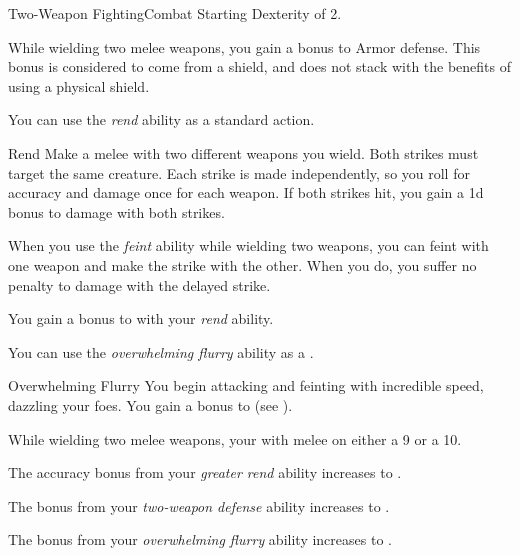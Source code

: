     \begin{feat}{Two-Weapon Fighting}{Combat}
        \featpre Starting Dexterity of 2.

         While wielding two melee weapons, you gain a  bonus to Armor defense.
        This bonus is considered to come from a shield, and does not stack with the benefits of using a physical shield.

         You can use the \textit{rend} ability as a standard action.
        \begin{apability}{Rend}
            Make a melee  with two different weapons you wield.
            Both strikes must target the same creature.
            Each strike is made independently, so you roll for accuracy and damage once for each weapon.
            If both strikes hit, you gain a \plus1d bonus to damage with both strikes.
        \end{apability}

         When you use the \textit{feint} ability while wielding two weapons, you can feint with one weapon and make the strike with the other.
        When you do, you suffer no penalty to damage with the delayed strike.

         You gain a  bonus to  with your \textit{rend} ability.

         You can use the \textit{overwhelming flurry} ability as a .
        \begin{attuneability}{Overwhelming Flurry}
            You begin attacking and feinting with incredible speed, dazzling your foes.
            You gain a  bonus to  (see ).
        \end{attuneability}

         While wielding two melee weapons, your  with melee   on either a 9 or a 10.

         The accuracy bonus from your \textit{greater rend} ability increases to .

         The bonus from your \textit{two-weapon defense} ability increases to .

         The bonus from your \textit{overwhelming flurry} ability increases to .
    \end{feat}

